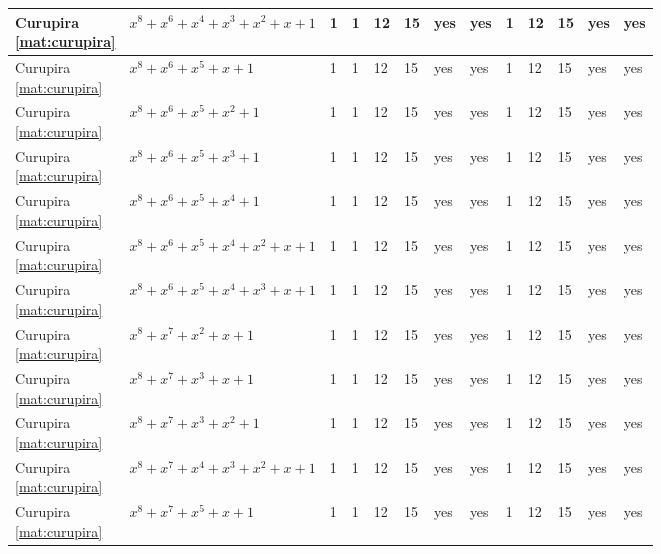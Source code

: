 \begin{tiny}
\begin{longtable}{|l|l|l|l|l|l|l|l|l|l|l|l|l|}
\shortstack{Curupira \\ \eqref{mat:curupira}} & $x^8 + x^6 + x^4 + x^3 + x^2 + x + 1$ & 1 & 1 & 12 & 15 & yes & yes & 1 & 12 & 15 & yes & yes \\ \hline
\shortstack{Curupira \\ \eqref{mat:curupira}} & $x^8 + x^6 + x^5 + x + 1$ & 1 & 1 & 12 & 15 & yes & yes & 1 & 12 & 15 & yes & yes \\ \hline
\shortstack{Curupira \\ \eqref{mat:curupira}} & $x^8 + x^6 + x^5 + x^2 + 1$ & 1 & 1 & 12 & 15 & yes & yes & 1 & 12 & 15 & yes & yes \\ \hline
\shortstack{Curupira \\ \eqref{mat:curupira}} & $x^8 + x^6 + x^5 + x^3 + 1$ & 1 & 1 & 12 & 15 & yes & yes & 1 & 12 & 15 & yes & yes \\ \hline
\shortstack{Curupira \\ \eqref{mat:curupira}} & $x^8 + x^6 + x^5 + x^4 + 1$ & 1 & 1 & 12 & 15 & yes & yes & 1 & 12 & 15 & yes & yes \\ \hline
\shortstack{Curupira \\ \eqref{mat:curupira}} & $x^8 + x^6 + x^5 + x^4 + x^2 + x + 1$ & 1 & 1 & 12 & 15 & yes & yes & 1 & 12 & 15 & yes & yes \\ \hline
\shortstack{Curupira \\ \eqref{mat:curupira}} & $x^8 + x^6 + x^5 + x^4 + x^3 + x + 1$ & 1 & 1 & 12 & 15 & yes & yes & 1 & 12 & 15 & yes & yes \\ \hline
\shortstack{Curupira \\ \eqref{mat:curupira}} & $x^8 + x^7 + x^2 + x + 1$ & 1 & 1 & 12 & 15 & yes & yes & 1 & 12 & 15 & yes & yes \\ \hline
\shortstack{Curupira \\ \eqref{mat:curupira}} & $x^8 + x^7 + x^3 + x + 1$ & 1 & 1 & 12 & 15 & yes & yes & 1 & 12 & 15 & yes & yes \\ \hline
\shortstack{Curupira \\ \eqref{mat:curupira}} & $x^8 + x^7 + x^3 + x^2 + 1$ & 1 & 1 & 12 & 15 & yes & yes & 1 & 12 & 15 & yes & yes \\ \hline
\shortstack{Curupira \\ \eqref{mat:curupira}} & $x^8 + x^7 + x^4 + x^3 + x^2 + x + 1$ & 1 & 1 & 12 & 15 & yes & yes & 1 & 12 & 15 & yes & yes \\ \hline
\shortstack{Curupira \\ \eqref{mat:curupira}} & $x^8 + x^7 + x^5 + x + 1$ & 1 & 1 & 12 & 15 & yes & yes & 1 & 12 & 15 & yes & yes \\ \hline

\end{longtable}
\end{tiny}
